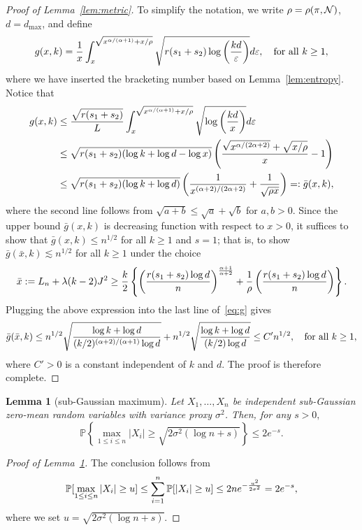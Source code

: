 \documentclass[11pt]{article}
\theoremstyle{plain}
\newtheorem{lem}{Lemma}
\theoremstyle{definition}
\begin{document}
\begin{proof}[Proof of Lemma~\ref{lem:metric}]
To simplify the notation, we write $\rho=\rho(\pi, \mathcal{N})$,  $d = d_{\max}$, and define
\begin{equation}\label{eq:complexity}
g(x, k)={1\over x}\int^{\sqrt{x^{\alpha/(\alpha+1)}+x/\rho}}_{x} \sqrt{r(s_1+s_2)\log\left({kd\over \varepsilon}\right)}d\varepsilon,\quad \text{for all }k\geq 1,
\end{equation}
where we have inserted the bracketing number based on Lemma~\ref{lem:entropy}.  Notice that
\begin{align}\label{eq:g}
g(x,k)&\leq {\sqrt{r(s_1+s_2)}\over L}\int_{x}^{\sqrt{x^{\alpha/(\alpha+1)}+x/\rho}}\sqrt{\log \left(kd \over x \right)}d\varepsilon\notag \\
&\leq \sqrt{r(s_1+s_2)(\log k+\log d - \log x)}\left({\sqrt{x^{\alpha/(2\alpha+2)}}+\sqrt{x/\rho} \over x }-1\right)\notag \\
&\leq  \sqrt{r(s_1+s_2)(\log k+\log d)}\left( {1\over x^{(\alpha+2)/(2\alpha+2)}}+{1\over \sqrt{\rho x}}\right) =: \bar g(x,k),
\end{align}
where the second line follows from $\sqrt{a+b} \leq \sqrt{a}+\sqrt{b}$ for $a,b>0$.  Since the upper bound $\bar g(x,k)$ is decreasing function with respect to $x>0$, it suffices to show that $\bar g( x, k) \leq n^{1/2}$ for all $k\geq 1$ and $s=1$; that is, to show $\bar g (\bar x, k)\lesssim n^{1/2}$ for all $k\geq 1$ under the choice
\[
\bar x := L_n+\lambda (k-2)J^2 \geq {k \over 2} \left\{\left({r(s_1+s_2)\log d \over n } \right)^{\alpha+1\over \alpha+2} + {1\over \rho }\left({r(s_1+s_2)\log d \over n } \right)\right\}.
\]
Plugging the above expression into the last line of~\eqref{eq:g} gives
\[
\bar g(\bar x,k)\leq n^{1/2}\sqrt{\log k+\log d\over (k/2)^{(\alpha+2)/(\alpha+1)} \log d}+n^{1/2}\sqrt{\log k+\log d \over (k/2) \log d }\leq C'n^{1/2},\quad \text{for all }k\geq 1,
\]
where $C'>0$ is a constant independent of $k$ and $d$. The proof is therefore complete. 
\end{proof}


\begin{lem}[sub-Gaussian maximum]\label{lem:subg}
Let $X_1,\ldots,X_n$ be independent sub-Gaussian zero-mean random variables with variance proxy $\sigma^2$. Then, for any $s>0,$
\[\mathbb{P}\left\{\max_{1\leq i\leq n}|X_i|\geq\sqrt{2\sigma^2(\log n +s)}\right\}\leq2 e^{-s}.\]
\end{lem}
\begin{proof}[Proof of Lemma~\ref{lem:subg}]
The conclusion follows from
\begin{align}
\mathbb{P}[\max_{1\leq i\leq n}|X_i|\geq u] \leq \sum_{i=1}^n\mathbb{P}[|X_i|\geq u]\leq 2n e^{-{u^2\over 2\sigma^2}} = 2e^{-s},
\end{align}
where we set $u = \sqrt{2\sigma^2(\log n+s)}.$
\end{proof}
\end{document}

